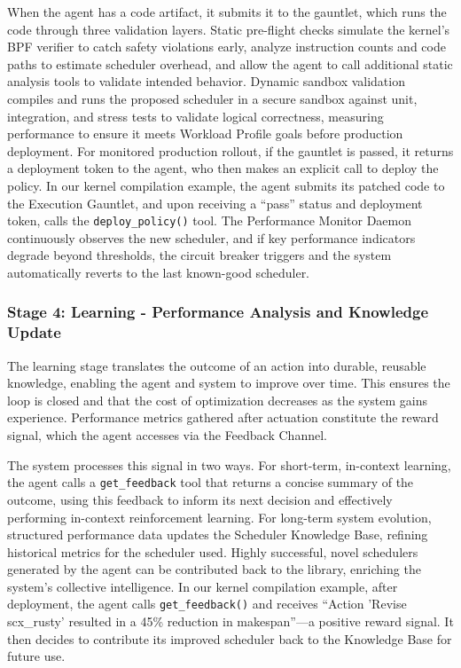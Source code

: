 When the agent has a code artifact, it submits it to the gauntlet, which runs the code through three validation layers. Static pre-flight checks simulate the kernel's BPF verifier to catch safety violations early, analyze instruction counts and code paths to estimate scheduler overhead, and allow the agent to call additional static analysis tools to validate intended behavior. Dynamic sandbox validation compiles and runs the proposed scheduler in a secure sandbox against unit, integration, and stress tests to validate logical correctness, measuring performance to ensure it meets Workload Profile goals before production deployment. For monitored production rollout, if the gauntlet is passed, it returns a deployment token to the agent, who then makes an explicit call to deploy the policy. In our kernel compilation example, the agent submits its patched code to the Execution Gauntlet, and upon receiving a ``pass'' status and deployment token, calls the \texttt{deploy\_policy()} tool. The Performance Monitor Daemon continuously observes the new scheduler, and if key performance indicators degrade beyond thresholds, the circuit breaker triggers and the system automatically reverts to the last known-good scheduler.

\subsubsection{Stage 4: Learning - Performance Analysis and Knowledge Update}

The learning stage translates the outcome of an action into durable, reusable knowledge, enabling the agent and system to improve over time. This ensures the loop is closed and that the cost of optimization decreases as the system gains experience. Performance metrics gathered after actuation constitute the reward signal, which the agent accesses via the Feedback Channel.

The system processes this signal in two ways. For short-term, in-context learning, the agent calls a \texttt{get\_feedback} tool that returns a concise summary of the outcome, using this feedback to inform its next decision and effectively performing in-context reinforcement learning. For long-term system evolution, structured performance data updates the Scheduler Knowledge Base, refining historical metrics for the scheduler used. Highly successful, novel schedulers generated by the agent can be contributed back to the library, enriching the system's collective intelligence. In our kernel compilation example, after deployment, the agent calls \texttt{get\_feedback()} and receives ``Action 'Revise scx\_rusty' resulted in a 45\% reduction in makespan''—a positive reward signal. It then decides to contribute its improved scheduler back to the Knowledge Base for future use.

